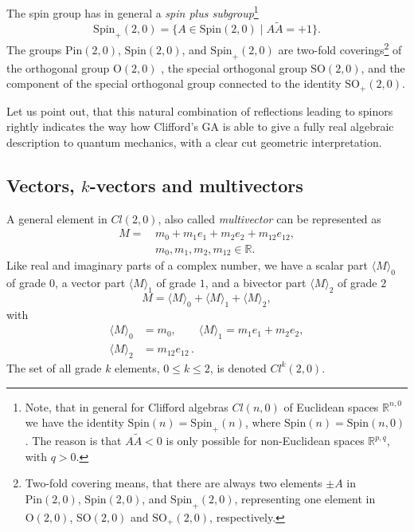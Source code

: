 \documentclass[cameraready]{jcmsi}%
\newcommand{\R}{\mathbb{R}}
\newcommand{\be}{\begin{equation}}
\newcommand{\ee}{\end{equation}}
\newcommand{\Pin}{\mathrm{Pin}}
\newcommand{\Spin}{\mathrm{Spin}}
\renewcommand{\O}{\mathrm{O}}
\newcommand{\SO}{\mathrm{SO}}
\begin{document}
The spin group has in general a \textit{spin plus subgroup}\footnote{Note, that in general for Clifford algebras $Cl(n,0)$ of Euclidean spaces $\R^{n,0}$ we have the identity 
$\Spin(n) = \Spin_+(n)$, where $\Spin(n) = \Spin(n,0)$. The reason is that $A\widetilde{A} < 0$ is only possible for non-Euclidean spaces $\R^{p,q}$, with $q>0$.}
\be 
  \Spin_+(2,0) = \{A\in \Spin(2,0) \mid A\widetilde{A}= +1\}. 
\ee
The groups $\Pin(2,0)$, $\Spin(2,0)$, and $\Spin_+(2,0)$ are two-fold coverings\footnote{Two-fold covering means, that there are always two elements $\pm A$ in $\Pin(2,0)$, $\Spin(2,0)$, and $\Spin_+(2,0)$, representing one element in $\O(2,0)$, $\SO(2,0)$ and $\SO_+(2,0)$, respectively.} of the orthogonal group $\O(2,0)$ \cite{Wiki:IOG}, the special orthogonal group $\SO(2,0)$, and the component of the special orthogonal group connected to the identity $\SO_+(2,0)$. 

Let us point out, that this natural combination of reflections leading to spinors rightly indicates the way how Clifford's GA is able to give a fully real algebraic description to quantum mechanics, with a clear cut geometric interpretation. 


\subsection{Vectors, $k$-vectors and multivectors}

A general element in $Cl(2,0)$, also called \textit{multivector} can be represented as
\begin{align} 
  M =\, &m_0 + m_1 e_1 + m_2 e_2 + m_{12} e_{12}, 
  \nonumber \\
  &m_0, m_1, m_2, m_{12} \in \R. 
\end{align}
Like real and imaginary parts of a complex number, we have 
a scalar part $\langle M \rangle_0$ of grade $0$, 
a vector part $\langle M \rangle_1$ of grade $1$, 
and a bivector part $\langle M \rangle_2$ of grade $2$
\be 
  M = \langle M \rangle_0 + \langle M \rangle_1 + \langle M \rangle_2,
\ee 
with 
\begin{align} 
  \langle M \rangle_0 &= m_0, \qquad
  \langle M \rangle_1 = m_1 e_1 + m_2 e_2, 
  \nonumber \\
  \langle M \rangle_2 &= m_{12} e_{12} \,. 
\end{align}
The set of all grade $k$ elements, $0 \leq k \leq 2$, is denoted $Cl^k(2,0)$.
\end{document}
